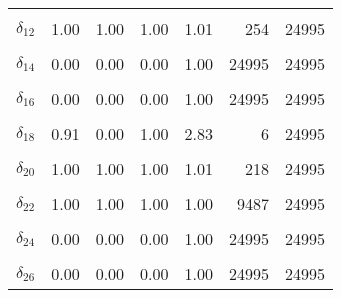 \begin{table}
\begin{tabular}[t]{lrrrrrr}
\cellcolor{gray!6}{$\delta_{11}$} & \cellcolor{gray!6}{0.66} & \cellcolor{gray!6}{0.00} & \cellcolor{gray!6}{1.00} & \cellcolor{gray!6}{1.52} & \cellcolor{gray!6}{9} & \cellcolor{gray!6}{24995}\\
$\delta_{12}$ & 1.00 & 1.00 & 1.00 & 1.01 & 254 & 24995\\
\cellcolor{gray!6}{$\delta_{13}$} & \cellcolor{gray!6}{0.44} & \cellcolor{gray!6}{0.00} & \cellcolor{gray!6}{1.00} & \cellcolor{gray!6}{1.80} & \cellcolor{gray!6}{7} & \cellcolor{gray!6}{24995}\\
$\delta_{14}$ & 0.00 & 0.00 & 0.00 & 1.00 & 24995 & 24995\\
\cellcolor{gray!6}{$\delta_{15}$} & \cellcolor{gray!6}{1.00} & \cellcolor{gray!6}{1.00} & \cellcolor{gray!6}{1.00} & \cellcolor{gray!6}{1.02} & \cellcolor{gray!6}{208} & \cellcolor{gray!6}{24995}\\
$\delta_{16}$ & 0.00 & 0.00 & 0.00 & 1.00 & 24995 & 24995\\
\cellcolor{gray!6}{$\delta_{17}$} & \cellcolor{gray!6}{0.85} & \cellcolor{gray!6}{0.00} & \cellcolor{gray!6}{1.00} & \cellcolor{gray!6}{1.64} & \cellcolor{gray!6}{8} & \cellcolor{gray!6}{24995}\\
$\delta_{18}$ & 0.91 & 0.00 & 1.00 & 2.83 & 6 & 24995\\
\cellcolor{gray!6}{$\delta_{19}$} & \cellcolor{gray!6}{0.00} & \cellcolor{gray!6}{0.00} & \cellcolor{gray!6}{0.00} & \cellcolor{gray!6}{1.00} & \cellcolor{gray!6}{24995} & \cellcolor{gray!6}{24995}\\
$\delta_{20}$ & 1.00 & 1.00 & 1.00 & 1.01 & 218 & 24995\\
\cellcolor{gray!6}{$\delta_{21}$} & \cellcolor{gray!6}{1.00} & \cellcolor{gray!6}{1.00} & \cellcolor{gray!6}{1.00} & \cellcolor{gray!6}{1.00} & \cellcolor{gray!6}{2770} & \cellcolor{gray!6}{24995}\\
$\delta_{22}$ & 1.00 & 1.00 & 1.00 & 1.00 & 9487 & 24995\\
\cellcolor{gray!6}{$\delta_{23}$} & \cellcolor{gray!6}{0.99} & \cellcolor{gray!6}{1.00} & \cellcolor{gray!6}{1.00} & \cellcolor{gray!6}{1.01} & \cellcolor{gray!6}{284} & \cellcolor{gray!6}{24995}\\
$\delta_{24}$ & 0.00 & 0.00 & 0.00 & 1.00 & 24995 & 24995\\
\cellcolor{gray!6}{$\delta_{25}$} & \cellcolor{gray!6}{0.95} & \cellcolor{gray!6}{0.00} & \cellcolor{gray!6}{1.00} & \cellcolor{gray!6}{1.45} & \cellcolor{gray!6}{11} & \cellcolor{gray!6}{24995}\\
$\delta_{26}$ & 0.00 & 0.00 & 0.00 & 1.00 & 24995 & 24995\\

\end{tabular}
\end{table}
